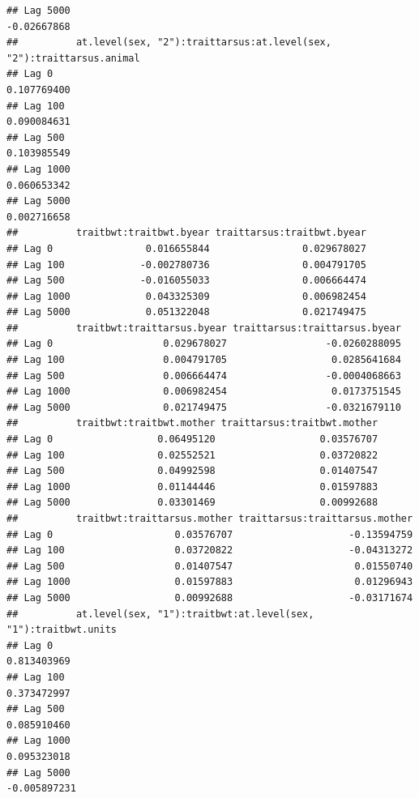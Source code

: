 \documentclass[
  12pt,
]{book}
\begin{document}
\begin{verbatim}
## Lag 5000                                                       -0.02667868
##          at.level(sex, "2"):traittarsus:at.level(sex, "2"):traittarsus.animal
## Lag 0                                                             0.107769400
## Lag 100                                                           0.090084631
## Lag 500                                                           0.103985549
## Lag 1000                                                          0.060653342
## Lag 5000                                                          0.002716658
##          traitbwt:traitbwt.byear traittarsus:traitbwt.byear
## Lag 0                0.016655844                0.029678027
## Lag 100             -0.002780736                0.004791705
## Lag 500             -0.016055033                0.006664474
## Lag 1000             0.043325309                0.006982454
## Lag 5000             0.051322048                0.021749475
##          traitbwt:traittarsus.byear traittarsus:traittarsus.byear
## Lag 0                   0.029678027                 -0.0260288095
## Lag 100                 0.004791705                  0.0285641684
## Lag 500                 0.006664474                 -0.0004068663
## Lag 1000                0.006982454                  0.0173751545
## Lag 5000                0.021749475                 -0.0321679110
##          traitbwt:traitbwt.mother traittarsus:traitbwt.mother
## Lag 0                  0.06495120                  0.03576707
## Lag 100                0.02552521                  0.03720822
## Lag 500                0.04992598                  0.01407547
## Lag 1000               0.01144446                  0.01597883
## Lag 5000               0.03301469                  0.00992688
##          traitbwt:traittarsus.mother traittarsus:traittarsus.mother
## Lag 0                     0.03576707                    -0.13594759
## Lag 100                   0.03720822                    -0.04313272
## Lag 500                   0.01407547                     0.01550740
## Lag 1000                  0.01597883                     0.01296943
## Lag 5000                  0.00992688                    -0.03171674
##          at.level(sex, "1"):traitbwt:at.level(sex, "1"):traitbwt.units
## Lag 0                                                      0.813403969
## Lag 100                                                    0.373472997
## Lag 500                                                    0.085910460
## Lag 1000                                                   0.095323018
## Lag 5000                                                  -0.005897231

\end{verbatim}
\end{document}
